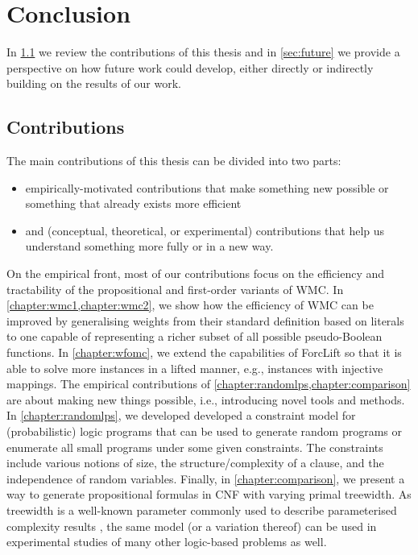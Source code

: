 \chapter{Conclusion} \label{chapter:conclusion} %

In \cref{sec:contributions} we review the contributions of this thesis and in \cref{sec:future} we provide a perspective on how future work could develop, either directly or indirectly building on the results of our work.

\section{Contributions} \label{sec:contributions}

The main contributions of this thesis can be divided into two parts:
\begin{itemize}
\item empirically-motivated contributions that make something new possible or something that already exists more efficient
\item and (conceptual, theoretical, or experimental) contributions that help us understand something more fully or in a new way.
\end{itemize}


On the empirical front, most of our contributions focus on the efficiency and tractability of the propositional and first-order variants of WMC. In \cref{chapter:wmc1,chapter:wmc2}, we show how the efficiency of WMC can be improved by generalising weights from their standard definition based on literals to one capable of representing a richer subset of all possible pseudo-Boolean functions. In \cref{chapter:wfomc}, we extend the capabilities of ForcLift \citep{DBLP:conf/ijcai/BroeckTMDR11} so that it is able to solve more instances in a lifted manner, e.g., instances with injective mappings. The empirical contributions of \cref{chapter:randomlps,chapter:comparison} are about making new things possible, i.e., introducing novel tools and methods. In \cref{chapter:randomlps}, we developed developed a constraint model for (probabilistic) logic programs that can be used to generate random programs or enumerate all small programs under some given constraints. The constraints include various notions of size, the structure/complexity of a clause, and the independence of random variables. Finally, in \cref{chapter:comparison}, we present a way to generate propositional formulas in CNF with varying primal treewidth. As treewidth is a well-known parameter commonly used to describe parameterised complexity results \citep{DBLP:series/txcs/DowneyF13}, the same model (or a variation thereof) can be used in experimental studies of many other logic-based problems as well.

